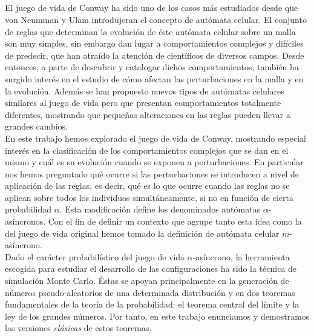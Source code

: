 \documentclass[../proyecto.tex]{memoir}
\begin{document}
\thispagestyle{empty}

\begin{center}
  {\large\bfseries \ProjectTitle}\\
\end{center}
  \begin{center}
  	
  \AuthorName\\
  \vspace{0.7cm}
  \\

  \vspace{0.7cm}
  \\
\end{center}
El juego de vida de Conway ha sido uno de los casos más estudiados desde que von Neumman y Ulam introdujeran el concepto de autómata celular. El conjunto de reglas que determinan la evolución de éste autómata celular sobre un malla son muy simples, sin embargo dan lugar a comportamientos complejos y difíciles de predecir, que han atraído la atención de científicos de diversos campos. Desde entonces, a parte de descubrir y catalogar dichos comportamientos, también ha surgido interés en el estudio de cómo afectan las perturbaciones en la malla y en la evolución. Además se han propuesto nuevos tipos de autómatas celulares similares al juego de vida pero que presentan comportamientos totalmente diferentes, mostrando que pequeñas alteraciones en las reglas pueden llevar a grandes cambios. \\

En este trabajo hemos explorado el juego de vida de Conway, mostrando especial interés en la clasificación de los comportamientos complejos que se dan en el mismo y cuál es su evolución cuando se exponen a perturbaciones. En particular nos hemos preguntado qué ocurre si las perturbaciones se introducen a nivel de aplicación de las reglas, es decir, qué es lo que ocurre cuando las reglas no se aplican sobre todos los individuos simultáneamente, si no en función de cierta probabilidad $\alpha$. Esta modificación define los denominados autómatas $\alpha$-asíncronos. Con el fin de definir un contexto que agrupe tanto esta idea como la del juego de vida original hemos tomado la definición de autómata celular $m$-asíncrono. \\

Dado el carácter probabilístico del juego de vida $\alpha$-asíncrono, la herramienta escogida para estudiar el desarrollo de las configuraciones ha sido la técnica de simulación Monte Carlo. Éstas se apoyan principalmente en la generación de números pseudo-aleatorios de una determinada distribución y en dos teoremas fundamentales de la teoría de la probabilidad: el teorema central del límite y la ley de los grandes números. Por tanto, en este trabajo enunciamos y demostramos las versiones \textit{clásicas} de estos teoremas. \\
\end{document}
